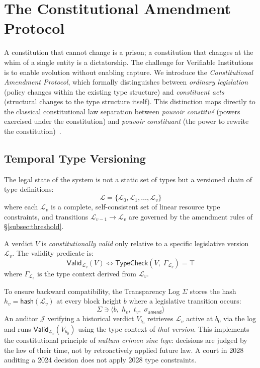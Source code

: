 \section{The Constitutional Amendment Protocol}
\label{sec:amendments}

A constitution that cannot change is a prison; a constitution that
changes at the whim of a single entity is a dictatorship. The challenge
for Verifiable Institutions is to enable evolution without enabling
capture. We introduce the \emph{Constitutional Amendment Protocol},
which formally distinguishes between \emph{ordinary legislation}
(policy changes within the existing type structure) and
\emph{constituent acts} (structural changes to the type structure
itself). This distinction maps directly to the classical constitutional
law separation between \emph{pouvoir constitu\'{e}} (powers exercised
under the constitution) and \emph{pouvoir constituant} (the power to
rewrite the constitution)~\cite{sieyes1789}.

\subsection{Temporal Type Versioning}
\label{subsec:versioning}

The legal state of the system is not a static set of types but a
versioned chain of type definitions:
\[
  \mathcal{L} = \{\mathcal{L}_0, \mathcal{L}_1, \dots, \mathcal{L}_v\}
\]
where each $\mathcal{L}_v$ is a complete, self-consistent set of linear
resource type constraints, and transitions $\mathcal{L}_{v-1} \to
\mathcal{L}_v$ are governed by the amendment rules of
\S\ref{subsec:threshold}.

\begin{definition}
\label{def:versioned-validity}
A verdict $V$ is \emph{constitutionally valid} only relative to a
specific legislative version $\mathcal{L}_v$. The validity predicate is:
\[
  \mathsf{Valid}_{\mathcal{L}_v}(V) \iff \mathsf{TypeCheck}(V,\; \Gamma_{\mathcal{L}_v}) = \top
\]
where $\Gamma_{\mathcal{L}_v}$ is the type context derived from
$\mathcal{L}_v$.
\end{definition}

To ensure backward compatibility, the Transparency Log $\Sigma$ stores
the hash $h_v = \mathsf{hash}(\mathcal{L}_v)$ at every block height
$b$ where a legislative transition occurs:
\[
  \Sigma \ni \langle b,\; h_v,\; t_v,\; \sigma_{\mathsf{amend}} \rangle
\]
An auditor $\mathcal{J}$ verifying a historical verdict $V_{b_0}$
retrieves $\mathcal{L}_v$ active at $b_0$ via the log and runs
$\mathsf{Valid}_{\mathcal{L}_v}(V_{b_0})$ using the type context of
\emph{that version}. This implements the constitutional principle of
\emph{nullum crimen sine lege}: decisions are judged by the law of
their time, not by retroactively applied future law. A court in 2028
auditing a 2024 decision does not apply 2028 type constraints.

